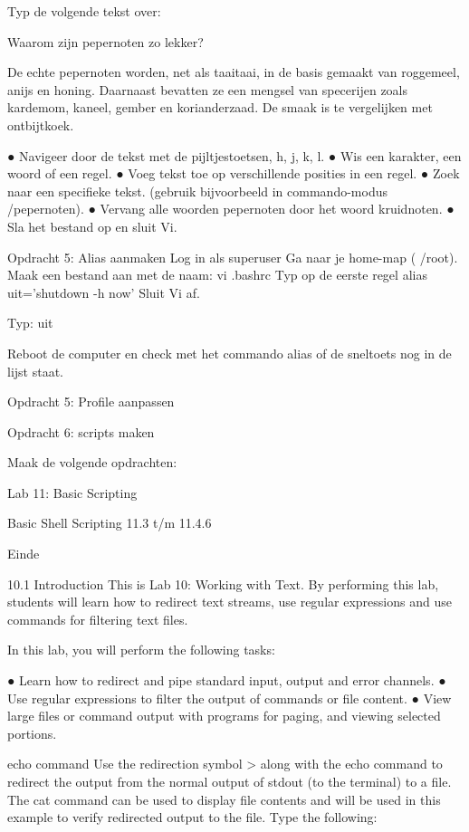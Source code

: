 Typ de volgende tekst over: 

Waarom zijn pepernoten zo lekker?

De echte pepernoten worden, net als taaitaai, in de basis gemaakt van roggemeel, anijs en honing. Daarnaast bevatten ze 
een mengsel van specerijen zoals kardemom, kaneel, gember en korianderzaad. De smaak is te vergelijken met ontbijtkoek.

● Navigeer door de tekst met de pijltjestoetsen, h, j, k, l.
● Wis een karakter, een woord of een regel.
● Voeg tekst toe op verschillende posities in een regel.
● Zoek naar een specifieke tekst. (gebruik bijvoorbeeld in commando-modus /pepernoten).
● Vervang alle woorden pepernoten door het woord kruidnoten.
● Sla het bestand op en sluit Vi.



Opdracht 5:  Alias aanmaken
Log in als superuser
Ga naar je home-map ( /root).
Maak een bestand aan met de naam: vi .bashrc
Typ op de eerste regel alias uit='shutdown -h now'
Sluit Vi af.

Typ: uit

Reboot de computer en check met het commando alias of de sneltoets nog in de lijst staat.



Opdracht 5:  Profile aanpassen



Opdracht 6:  scripts maken

Maak de volgende opdrachten:

Lab 11: Basic Scripting    

Basic Shell Scripting 11.3 t/m 11.4.6



Einde


10.1 Introduction
This is Lab 10: Working with Text. By performing this lab, students will learn how to redirect text streams, use regular expressions and 
use commands for filtering text files.

In this lab, you will perform the following tasks:

● Learn how to redirect and pipe standard input, output and error channels.
● Use regular expressions to filter the output of commands or file content.
● View large files or command output with programs for paging, and viewing selected portions.



echo command
Use the redirection symbol > along with the echo command to redirect the output from the normal output of stdout (to the 
terminal) to a file. The cat command can be used to display file contents and will be used in this example to verify 
redirected output to the file. Type the following:




